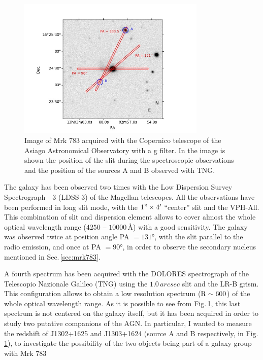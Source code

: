 \documentclass[../main.tex]{subfiles}
\begin{document}
\begin{figure}
\centering
\includegraphics[width=0.8\textwidth]{images/paper3/finding.jpg} 
\caption[]{Image of Mrk 783 acquired with the Copernico telescope of the Asiago Astronomical Observatory with a g filter. In the image is shown the position of the slit during the spectroscopic observations and the position of the sources A and B observed with TNG.}
\label{fig:finding_chart}
\end{figure}

The galaxy has been observed two times with the Low Dispersion Survey Spectrograph - 3 (LDSS-3) of the Magellan telescopes.
All the observations have been performed in long slit mode, with the $1"\times4'$ ``center'' slit and the VPH-All.
This combination of slit and dispersion element allows to cover almost the whole optical wavelength range ($4250$ -- $10000\,\si{\angstrom}$) with a good sensitivity.
The galaxy was observed twice at position angle PA $=\ang{131}$, with the slit parallel to the radio emission, and once at PA $=\ang{90}$, in order to observe the secondary nucleus mentioned in Sec.\,\ref{sec:mrk783}.

A fourth spectrum has been acquired with the DOLORES spectrograph of the Telescopio Nazionale Galileo (TNG) using the $1.0\,\si{arcsec}$ slit and the LR-B grism.
This configuration allows to obtain a low resolution spectrum (${\rm R}\sim 600$) of the whole optical wavelength range.
As it is possible to see from Fig.\,\ref{fig:finding_chart}, this last spectrum is not centered on the galaxy itself, but it has been acquired in order to study two putative companions of the AGN.
In particular, I wanted to measure the redshift of J1302+1625 and J1303+1624 (source A and B respectively, in Fig.\,\ref{fig:finding_chart}), to investigate the possibility of the two objects being part of a galaxy group with Mrk 783
\end{document}
